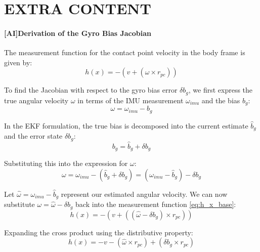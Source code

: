 \documentclass[report.tex]{subfiles}
\begin{document}
    \chapter{EXTRA CONTENT}

    \subsubsection{[AI]Derivation of the Gyro Bias Jacobian}
    
    The measurement function for the contact point velocity in the body frame is given by:
    \begin{equation}
        h(x) = - (v + (\omega \times r_{pc}))
        \label{eq:h_x_base}
    \end{equation}
    
    To find the Jacobian with respect to the gyro bias error $\delta b_g$, we first express the true angular velocity $\omega$ in terms of the IMU measurement $\omega_{imu}$ and the bias
      $b_g$:
    \begin{equation}
        \omega = \omega_{imu} - b_g
    \end{equation}

    In the EKF formulation, the true bias is decomposed into the current estimate $\hat{b}_g$ and the error state $\delta b_g$:
    \begin{equation}
        b_g = \hat{b}_g + \delta b_g
    \end{equation}

    Substituting this into the expression for $\omega$:
    \begin{equation}
        \omega = \omega_{imu} - (\hat{b}_g + \delta b_g) = (\omega_{imu} - \hat{b}_g) - \delta b_g
    \end{equation}

    Let $\hat{\omega} = \omega_{imu} - \hat{b}_g$ represent our estimated angular velocity. We can now substitute $\omega = \hat{\omega} - \delta b_g$ back into the measurement function \ref{eq:h_x_base}:
    \begin{equation}
        h(x) = - (v + ((\hat{\omega} - \delta b_g) \times r_{pc}))
    \end{equation}

    Expanding the cross product using the distributive property:
    \begin{equation}
        h(x) = -v - (\hat{\omega} \times r_{pc}) + (\delta b_g \times r_{pc})
    \end{equation}
\end{document}
